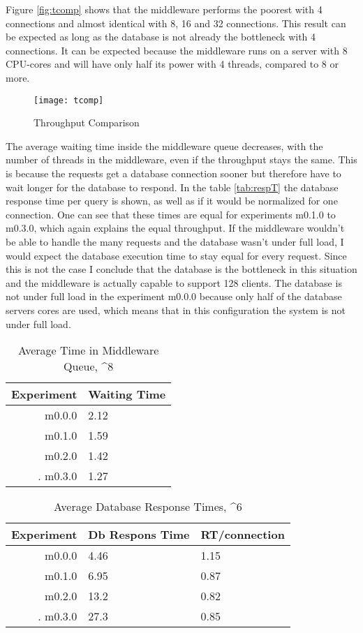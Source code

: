 \documentclass[
10pt, %
a4paper, %
oneside, %
headinclude,footinclude, %
BCOR5mm, %
]{scrartcl}
\begin{document}
Figure \vref{fig:tcomp} shows that the middleware performs the poorest with 4 connections and almost identical with 8, 16 and 32 connections. This result can be expected as long as the database is not already the bottleneck with 4 connections. It can be expected because the middleware runs on a server with 8 CPU-cores and will have only half its power with 4 threads, compared to 8 or more.
 

\begin{figure}[H]
\centering
\texttt{[image: tcomp]}
\caption{Throughput Comparison}
\label{fig:tcomp}
\end{figure}


 The average waiting time inside the middleware queue decreases, with the number of threads in the middleware, even if the throughput stays the same. This is because the requests get a database connection sooner but therefore have to wait longer for the database to respond. In the table \vref{tab:respT} the database response time per query is shown, as well as if it would be normalized for one connection. One can see that these times are equal for experiments m0.1.0 to m0.3.0, which again explains the equal throughput. If the middleware wouldn't be able to handle the many requests and the database wasn't under full load, I would expect the database execution time to stay equal for every request. Since this is not the case I conclude that the database is the bottleneck in this situation and the middleware is actually capable to support 128 clients. The database is not under full load in the experiment m0.0.0 because only half of the database servers cores are used, which means that in this configuration the system is not under full load.


\begin{table}[H]

\caption{Average Time in Middleware Queue, \^{}8}
\centering
\begin{tabular}{|r|l|}
\toprule
Experiment & Waiting Time\\
\midrule
m0.0.0&2.12\\
m0.1.0&1.59\\
m0.2.0&1.42\\.
m0.3.0&1.27\\
\bottomrule
\end{tabular}
\label{tab:queueT}
\end{table}


\begin{table}[H]

\caption{Average Database Response Times, \^{}6}
\centering
\begin{tabular}{|r|l|l|}
\toprule
Experiment & Db Respons Time & RT/connection\\
\midrule
m0.0.0&4.46&1.15\\
m0.1.0&6.95&0.87\\
m0.2.0&13.2&0.82\\.
m0.3.0&27.3&0.85\\
\bottomrule
\end{tabular}
\label{tab:respT}
\end{table}
\end{document}
